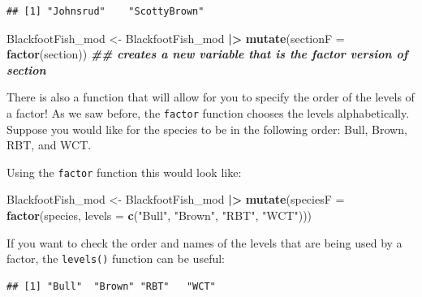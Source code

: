 \documentclass[
  10pt,
  letterpaper,
  twoside,
  openright]{book}
\newenvironment{Shaded}{\begin{snugshade}}{\end{snugshade}}
\newcommand{\AttributeTok}[1]{\textcolor[rgb]{0.13,0.29,0.53}{#1}}
\newcommand{\DocumentationTok}[1]{\textcolor[rgb]{0.56,0.35,0.01}{\textbf{\textit{#1}}}}
\newcommand{\FunctionTok}[1]{\textcolor[rgb]{0.13,0.29,0.53}{\textbf{#1}}}
\newcommand{\NormalTok}[1]{#1}
\newcommand{\OtherTok}[1]{\textcolor[rgb]{0.56,0.35,0.01}{#1}}
\newcommand{\SpecialCharTok}[1]{\textcolor[rgb]{0.81,0.36,0.00}{\textbf{#1}}}
\newcommand{\StringTok}[1]{\textcolor[rgb]{0.31,0.60,0.02}{#1}}
\begin{document}
\begin{verbatim}
## [1] "Johnsrud"    "ScottyBrown"
\end{verbatim}

\begin{Shaded}
\begin{Highlighting}[]
\NormalTok{BlackfootFish\_mod }\OtherTok{\textless{}{-}}\NormalTok{ BlackfootFish\_mod }\SpecialCharTok{|\textgreater{}}
  \FunctionTok{mutate}\NormalTok{(}\AttributeTok{sectionF =} \FunctionTok{factor}\NormalTok{(section))}
\DocumentationTok{\#\# creates a new variable that is the factor version of section}
\end{Highlighting}
\end{Shaded}

There is also a function that will allow for you to specify the order of
the levels of a factor! As we saw before, the \texttt{factor} function
chooses the levels alphabetically. Suppose you would like for the
species to be in the following order: Bull, Brown, RBT, and WCT.

Using the \texttt{factor} function this would look like:

\begin{Shaded}
\begin{Highlighting}[]
\NormalTok{BlackfootFish\_mod }\OtherTok{\textless{}{-}}\NormalTok{ BlackfootFish\_mod }\SpecialCharTok{|\textgreater{}}
  \FunctionTok{mutate}\NormalTok{(}\AttributeTok{speciesF =} \FunctionTok{factor}\NormalTok{(species, }
                           \AttributeTok{levels =} \FunctionTok{c}\NormalTok{(}\StringTok{"Bull"}\NormalTok{, }\StringTok{"Brown"}\NormalTok{, }\StringTok{"RBT"}\NormalTok{, }\StringTok{"WCT"}\NormalTok{)))}
\end{Highlighting}
\end{Shaded}

If you want to check the order and names of the levels that are being
used by a factor, the \texttt{levels()} function can be useful:

\begin{Shaded}
\end{Shaded}

\begin{verbatim}
## [1] "Bull"  "Brown" "RBT"   "WCT"
\end{verbatim}
\end{document}

